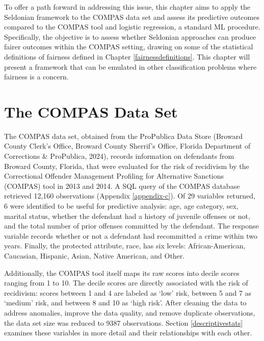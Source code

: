 \documentclass[12pt, twoside]{amherstthesis}
\begin{document}
To offer a path forward in addressing this issue, this chapter aims to apply the Seldonian framework to the COMPAS data set and assess its predictive outcomes compared to the COMPAS tool and logistic regression, a standard ML procedure. Specifically, the objective is to assess whether Seldonian approaches can produce fairer outcomes within the COMPAS setting, drawing on some of the statistical definitions of fairness defined in Chapter \ref{fairnessdefinitions}. This chapter will present a framework that can be emulated in other classification problems where fairness is a concern.

\hypertarget{the-compas-data-set}{%
\section{The COMPAS Data Set}\label{the-compas-data-set}}

The COMPAS data set, obtained from the ProPublica Data Store (Broward County Clerk's Office, Broward County Sherrif's Office, Florida Department of Corrections \& ProPublica, 2024), records information on defendants from Broward County, Florida, that were evaluated for the risk of recidivism by the Correctional Offender Management Profiling for Alternative Sanctions (COMPAS) tool in 2013 and 2014. A SQL query of the COMPAS database retrieved 12,160 observations (Appendix \ref{appendix-c}). Of 29 variables returned, 6 were identified to be useful for predictive analysis: age, age category, sex, marital status, whether the defendant had a history of juvenile offenses or not, and the total number of prior offenses committed by the defendant. The response variable records whether or not a defendant had recommitted a crime within two years. Finally, the protected attribute, race, has six levels: African-American, Caucasian, Hispanic, Asian, Native American, and Other.

Additionally, the COMPAS tool itself maps its raw scores into decile scores ranging from 1 to 10. The decile scores are directly associated with the risk of recidivism: scores between 1 and 4 are labeled as `low' risk, between 5 and 7 as `medium' risk, and between 8 and 10 as `high risk'. After cleaning the data to address anomalies, improve the data quality, and remove duplicate observations, the data set size was reduced to 9387 observations. Section \ref{descriptivestats} examines these variables in more detail and their relationships with each other.
\end{document}
